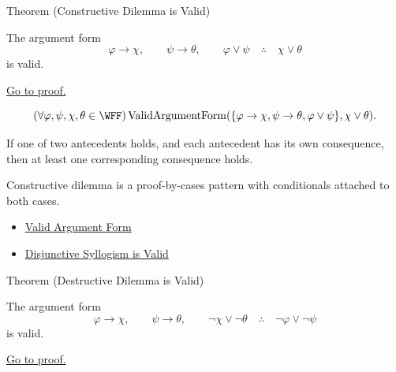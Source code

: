 \begin{theorembox}{Theorem (Constructive Dilemma is Valid)}
\begin{theorem}
\label{thm:constructive-dilemma-validity-propositional-logic}
The argument form
\[
\varphi\to\chi,\qquad \psi\to\theta,\qquad \varphi\lor\psi
\quad\therefore\quad
\chi\lor\theta
\]
is valid.

\noindent\hyperref[prf:constructive-dilemma-validity-propositional-logic]{Go to proof.}
\end{theorem}
\end{theorembox}

\begin{remark*}
\[
(\forall\varphi,\psi,\chi,\theta\in\WFF)
\operatorname{ValidArgumentForm}(\{\varphi\to\chi,\psi\to\theta,\varphi\lor\psi\},\chi\lor\theta).
\]
\end{remark*}

\begin{remark*}
If one of two antecedents holds, and each antecedent has its own consequence,
then at least one corresponding consequence holds.
\end{remark*}

\begin{remark*}[Interpretation]
Constructive dilemma is a proof-by-cases pattern with conditionals attached to
both cases.
\end{remark*}

\begin{dependencies}
\begin{itemize}
  \item \hyperref[def:valid-argument-form-propositional-logic]{Valid Argument Form}
  \item \hyperref[thm:disjunctive-syllogism-validity-propositional-logic]{Disjunctive Syllogism is Valid}
\end{itemize}
\end{dependencies}

\begin{theorembox}{Theorem (Destructive Dilemma is Valid)}
\begin{theorem}
\label{thm:destructive-dilemma-validity-propositional-logic}
The argument form
\[
\varphi\to\chi,\qquad \psi\to\theta,\qquad \neg\chi\lor\neg\theta
\quad\therefore\quad
\neg\varphi\lor\neg\psi
\]
is valid.

\noindent\hyperref[prf:destructive-dilemma-validity-propositional-logic]{Go to proof.}
\end{theorem}
\end{theorembox}

